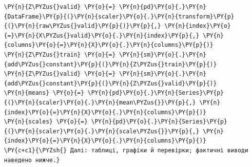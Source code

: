 \begin{Verbatim}[commandchars=\\\{\}]
\PY{n}{Z\PYZus{}valid} \PY{o}{=} \PY{n}{pd}\PY{o}{.}\PY{n}{DataFrame}\PY{p}{(}\PY{n}{scaler}\PY{o}{.}\PY{n}{transform}\PY{p}{(}\PY{n}{raw\PYZus{}valid}\PY{p}{)}\PY{p}{,} \PY{n}{index}\PY{o}{=}\PY{n}{X\PYZus{}valid}\PY{o}{.}\PY{n}{index}\PY{p}{,} \PY{n}{columns}\PY{o}{=}\PY{n}{X}\PY{o}{.}\PY{n}{columns}\PY{p}{)}
\PY{n}{Z\PYZus{}train} \PY{o}{=} \PY{n}{sm}\PY{o}{.}\PY{n}{add\PYZus{}constant}\PY{p}{(}\PY{n}{Z\PYZus{}train}\PY{p}{)}
\PY{n}{Z\PYZus{}valid} \PY{o}{=} \PY{n}{sm}\PY{o}{.}\PY{n}{add\PYZus{}constant}\PY{p}{(}\PY{n}{Z\PYZus{}valid}\PY{p}{)}
\PY{n}{means} \PY{o}{=} \PY{n}{pd}\PY{o}{.}\PY{n}{Series}\PY{p}{(}\PY{n}{scaler}\PY{o}{.}\PY{n}{mean\PYZus{}}\PY{p}{,} \PY{n}{index}\PY{o}{=}\PY{n}{X}\PY{o}{.}\PY{n}{columns}\PY{p}{)}
\PY{n}{scales} \PY{o}{=} \PY{n}{pd}\PY{o}{.}\PY{n}{Series}\PY{p}{(}\PY{n}{scaler}\PY{o}{.}\PY{n}{scale\PYZus{}}\PY{p}{,} \PY{n}{index}\PY{o}{=}\PY{n}{X}\PY{o}{.}\PY{n}{columns}\PY{p}{)}
\PY{c+c1}{\PYZsh{} Далі: таблиці, графіки й перевірки; фактичні виводи наведено нижче.}
\end{Verbatim}
